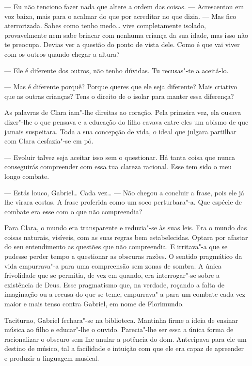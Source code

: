 --- Eu não tenciono fazer nada que altere a ordem das coisas. ---
Acrescentou em voz baixa, mais para o acalmar do que por acreditar no
que dizia. --- Mas fico aterrorizada. Sabes como tenho medo\ldots{} vive
completamente isolado, provavelmente nem sabe brincar com nenhuma
criança da sua idade, mas isso não te preocupa. Devias ver a questão do
ponto de vista dele. Como é que vai viver com os outros quando chegar a
altura?

--- Ele é diferente dos outros, não tenho dúvidas. Tu recusas"-te a
aceitá-lo.

--- Mas é diferente porquê? Porque queres que ele seja diferente? Mais
criativo que as outras crianças? Tens o direito de o isolar para manter
essa diferença?

As palavras de Clara iam"-lhe direitas ao coração. Pela primeira vez, ela
ousava dizer"-lhe o que pensava e a educação do filho cavava entre eles
um abismo de que jamais suspeitara. Toda a sua concepção de vida, o
ideal que julgara partilhar com Clara desfazia"-se em pó.

--- Evoluir talvez seja aceitar isso sem o questionar. Há tanta coisa que
nunca conseguirás compreender com essa tua clareza racional. Esse tem
sido o meu longo combate.

--- Estás louco, Gabriel\ldots{} Cada vez\ldots{} --- Não chegou a concluir a frase,
pois ele já lhe virara costas. A frase proferida como um soco
perturbara"-a. Que espécie de combate era esse com o que não compreendia?

Para Clara, o mundo era transparente e reduzia"-se às suas leis. Era o
mundo das coisas naturais, visíveis, com as suas regras bem
estabelecidas. Optara por afastar do seu entendimento as questões que
não compreendia. E irritava"-a que se pudesse perder tempo a questionar
as obscuras razões. O sentido pragmático da vida empurrava"-a para uma
compreensão sem zonas de sombra. A única frivolidade que se permitia, de
vez em quando, era interrogar"-se sobre a existência de Deus. Esse
pragmatismo que, na verdade, roçando a falta de imaginação ou a recusa
do que se teme, empurrava"-a para um combate cada vez maior e mais tenso
contra Gabriel, em nome de Florimundo.

Taciturno, Gabriel fechara"-se na biblioteca. Mantinha firme a ideia de
ensinar música ao filho e educar"-lhe o ouvido. Parecia"-lhe ser essa a
única forma de racionalizar o obscuro sem lhe anular a potência do dom.
Antecipava para ele um destino de músico, tal a facilidade e intuição
com que ele era capaz de apreender e produzir a linguagem musical.

